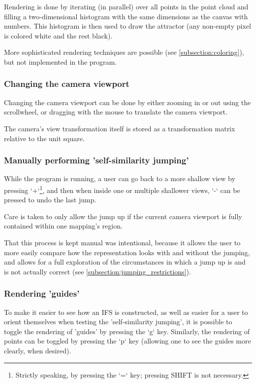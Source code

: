 \documentclass[11pt]{article}
\begin{document}
Rendering is done by iterating (in parallel) over all points in the point cloud and filling a two-dimensional histogram with the same dimensions
as the canvas with numbers. 
This histogram is then used to draw the attractor (any non-empty pixel is colored white and the rest black).

More sophisticated rendering techniques are possible (see \autoref{subsection:coloring}), 
but not implemented in the program.

\subsubsection{Changing the camera viewport}
\label{sec:org5e758da}
Changing the camera viewport can be done by either zooming in or out using the scrollwheel,
or dragging with the mouse to translate the camera viewport.

The camera's view transformation itself is stored as a transformation matrix relative to the unit square.

\subsubsection{Manually performing 'self-similarity jumping'}
\label{sec:orgcd56b9c}

While the program is running, a user can go back to a more shallow view by pressing `+`\footnote{Strictly speaking, by pressing the `=` key; pressing SHIFT is not necessary.}, and then when inside one or multiple shallower views,
`-` can be pressed to undo the last jump.

Care is taken to only allow the jump up if the current camera viewport is fully contained within one mapping's region.

That this process is kept manual was intentional, because it allows the user to more easily compare how
the representation looks with and without the jumping, and allows for a full exploration of the circumstances
in which a jump up is and is not actually correct (see \autoref{subsection:jumping_restrictions}).
\subsubsection{Rendering 'guides'}
\label{sec:orge5d5076}

To make it easier to see how an IFS is constructed, as well as easier for a user to orient themselves when
testing the 'self-similarity jumping', it is possible to toggle the rendering of 'guides' by pressing the `g` key.
Similarly, the rendering of points can be toggled by pressing the `p` key (allowing one to see the guides more clearly, when desired).
\end{document}
